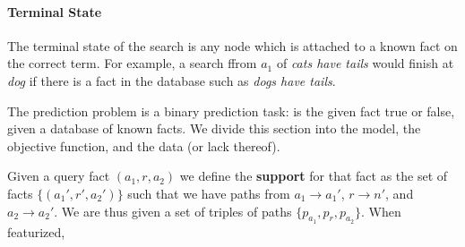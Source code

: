 \documentclass[11pt,a4paper]{article}
\def\w#1{\textit{#1}}
\begin{document}
\paragraph{Terminal State}
The terminal state of the search is any node which
  is attached to a known fact on the correct term.
For example, a search ffrom $a_1$ of \w{cats have tails}
  would finish at \w{dog} if there is a fact in the
  database such as \w{dogs have tails}.


The prediction problem is a binary prediction task: is the given fact true
  or false, given a database of known facts.
We divide this section into the model, the objective function, and the
  data (or lack thereof).

Given a query fact $(a_1, r, a_2)$ we define the \textbf{support} for that
  fact as the set of facts $\{ (a_1', r', a_2') \}$ such that we have
  paths from $a_1 \rightarrow a_1'$, $r \rightarrow n'$,
  and $a_2 \rightarrow a_2'$.
We are thus given a set of triples of paths $\{p_{a_1}, p_{r}, p_{a_2}\}$.
When featurized, 

\end{document}
